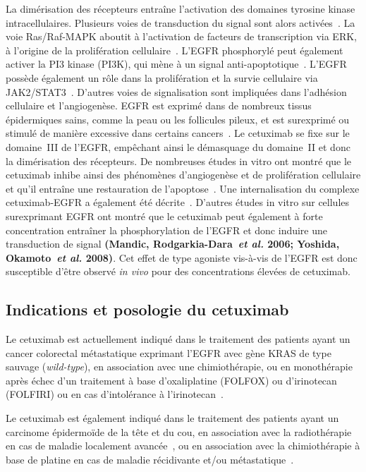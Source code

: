 La dimérisation des récepteurs entraîne l'activation des domaines tyrosine kinase intracellulaires. Plusieurs voies de transduction du signal sont alors activées~\citep{REF98}. La voie Ras/Raf-MAPK aboutit à l'activation de facteurs de transcription via ERK, à l'origine de la prolifération cellulaire~\citep{REF99}. L'EGFR phosphorylé peut également activer la PI3 kinase (PI3K), qui mène à un signal anti-apoptotique~\citep{REF100}. L'EGFR possède également un rôle dans la prolifération et la survie cellulaire via JAK2/STAT3~\citep{REF101}. D'autres voies de signalisation sont impliquées dans l'adhésion cellulaire et l'angiogenèse. EGFR est exprimé dans de nombreux tissus épidermiques sains, comme la peau ou les follicules pileux, et est surexprimé ou stimulé de manière excessive dans certains cancers~\citep{REF102}.
Le cetuximab se fixe sur le domaine~III de l'EGFR, empêchant ainsi le démasquage du domaine~II et donc la dimérisation des récepteurs. De nombreuses études in vitro ont montré que le cetuximab inhibe ainsi des phénomènes d'angiogenèse et de prolifération cellulaire et qu'il entraîne une restauration de l'apoptose~\citep{REF103}. Une internalisation du complexe cetuximab-EGFR a également été décrite~\citep{REF43}. D'autres études in vitro sur cellules surexprimant EGFR ont montré que le cetuximab peut également à forte concentration entraîner la phosphorylation de l'EGFR et donc induire une transduction de signal \textbf{(Mandic, Rodgarkia-Dara~\textit{et al.} 2006; Yoshida, Okamoto~\textit{et al.} 2008)}. Cet effet de type agoniste vis-à-vis de l'EGFR est donc susceptible d'être observé \textit{in vivo} pour des concentrations élevées de cetuximab.

\subsection{Indications et posologie du cetuximab}
Le cetuximab est actuellement indiqué dans le traitement des patients ayant un cancer colorectal métastatique exprimant l'EGFR avec gène KRAS de type sauvage (\textit{wild-type}), en association avec une chimiothérapie, ou en monothérapie après échec d'un traitement à base d'oxaliplatine (FOLFOX) ou d'irinotecan (FOLFIRI) ou en cas d'intolérance à l'irinotecan~\citep{REF104}.

Le cetuximab est également indiqué dans le traitement des patients ayant un carcinome épidermoïde de la tête et du cou, en association avec la radiothérapie en cas de maladie localement avancée~\citep{REF105}, ou en association avec la chimiothérapie à base de platine en cas de maladie récidivante et/ou métastatique~\citep{REF106}.

